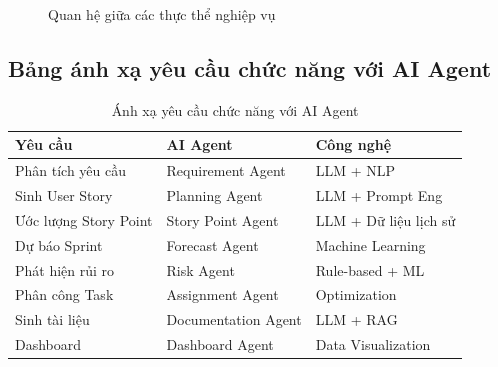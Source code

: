 \documentclass[12pt,a4paper]{report}
\begin{document}
\begin{figure}[H]
\centering
{}
\caption{Quan hệ giữa các thực thể nghiệp vụ}
\label{fig:entity_relationships}
\end{figure}

\subsection{Bảng ánh xạ yêu cầu chức năng với AI Agent}

\begin{table}[H]
\centering
\caption{Ánh xạ yêu cầu chức năng với AI Agent}
\begin{tabular}{|p{4.5cm}|p{4.5cm}|p{4.5cm}|}
\hline
\textbf{Yêu cầu} & \textbf{AI Agent} & \textbf{Công nghệ} \\
\hline
Phân tích yêu cầu & Requirement Agent & LLM + NLP \\
\hline
Sinh User Story & Planning Agent & LLM + Prompt Eng \\
\hline
Ước lượng Story Point & Story Point Agent & LLM + Dữ liệu lịch sử \\
\hline
Dự báo Sprint & Forecast Agent & Machine Learning \\
\hline
Phát hiện rủi ro & Risk Agent & Rule-based + ML \\
\hline
Phân công Task & Assignment Agent & Optimization \\
\hline
Sinh tài liệu & Documentation Agent & LLM + RAG \\
\hline
Dashboard & Dashboard Agent & Data Visualization \\
\hline
\end{tabular}
\label{tab:requirement_agent_mapping}
\end{table}
\end{document}
